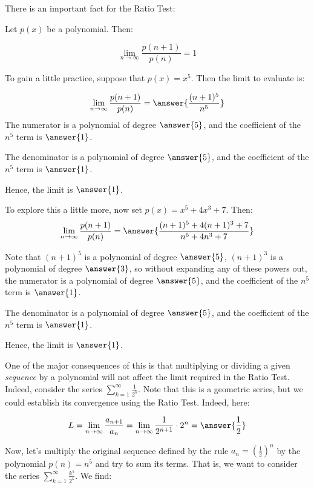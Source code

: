 \documentclass{ximera}
\author{Jim Talamo}
\begin{document}
\begin{exercise}
There is an important fact for the Ratio Test:

Let $p(x)$ be a polynomial.  Then:

\[
\lim_{n \to \infty} \frac{p(n+1)}{p(n)} = 1
\]

\begin{exercise}
To gain a little practice, suppose that $p(x) = x^5$.  Then the limit to evaluate is:

\[
\lim_{n \to \infty} \frac{p(n+1)}{p(n)} = \answer{\frac{(n+1)^5}{n^5}}
\]
The numerator is a polynomial of degree $\answer{5}$, and the coefficient of the $n^5$ term is $\answer{1}$.

The denominator is a polynomial of degree $\answer{5}$, and the coefficient of the $n^5$ term is $\answer{1}$.

Hence, the limit is $\answer{1}$.

\begin{exercise}
To explore this a little more, now set $p(x) = x^5+4x^3+7$.  Then:
\[
\lim_{n \to \infty} \frac{p(n+1)}{p(n)} = \answer{\frac{(n+1)^5+4(n+1)^3+7}{n^5+4n^3+7}}
\]

Note that $(n+1)^5$ is a polynomial of degree $\answer{5}$, $(n+1)^3$ is a polynomial of degree $\answer{3}$, so without expanding any of these powers out, the numerator is a polynomial of degree $\answer{5}$, and the coefficient of the $n^5$ term is $\answer{1}$.

The denominator is a polynomial of degree $\answer{5}$, and the coefficient of the $n^5$ term is $\answer{1}$.

Hence, the limit is $\answer{1}$.

\end{exercise}


\begin{exercise}
One of the major consequences of this is that multiplying or dividing a given \emph{sequence} by a polynomial will not affect the limit required in the Ratio Test.  Indeed, consider the series $\sum_{k=1}^{\infty} \frac{1}{2^k}$.  Note that this is a geometric series, but we could establish its convergence using the Ratio Test.  Indeed, here:

\[
L = \lim_{n \to \infty} \frac{a_{n+1}}{a_n} = \lim_{n \to \infty} \frac{1}{2^{n+1}}\cdot 2^n = \answer{\frac{1}{2}}
\]

Now, let's multiply the original sequence defined by the rule $a_n = \left(\frac{1}{2}\right)^n$ by the polynomial $p(n) = n^5$ and try to sum its terms.  That is, we want to consider the series $\sum_{k=1}^{\infty} \frac{k^5}{2^k}$. We find:


\end{exercise}
\end{exercise}
\end{exercise}
\end{document}
